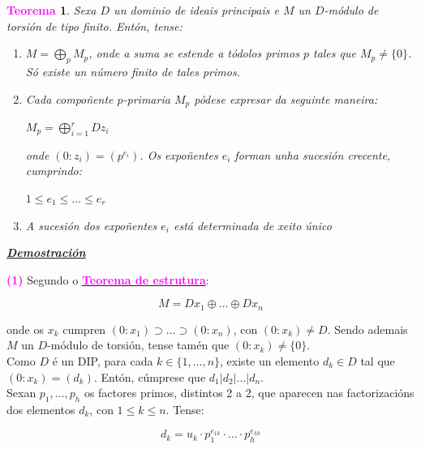\documentclass[twoside]{report}
\newcommand{\magbf}[1]{\textcolor{magenta}{\textbf{#1}}} %
\theoremstyle{mystyle}
\newtheorem{theo}{\magbf{Teorema}}[chapter]
\newenvironment{theorem}
{\begin{mdframed}[linecolor = magenta,backgroundcolor = classicrose, linewidth = 2mm]\begin{theo}}
{\end{theo}\end{mdframed}}
\begin{document}
\begin{theorem} \label{th4.3}
Sexa $D$ un dominio de ideais principais e $M$ un $D$-módulo de torsión de tipo finito. Entón, tense:
\begin{enumerate}
    \item $M = \displaystyle \bigoplus_{p}M_{p}$, onde a suma se estende a tódolos primos $p$ tales que $M_{p} \neq \{0\}$. Só existe un número finito de tales primos.
    \item Cada compoñente $p$-primaria $M_{p}$ pódese expresar da seguinte maneira:
        \begin{center}
            $M_{p} = \displaystyle \bigoplus_{i = 1}^{r}Dz_{i}$
        \end{center}
    onde $(0 : z_{i}) = (p^{e_{i}})$. Os expoñentes $e_{i}$ forman unha sucesión crecente, cumprindo:
        \begin{center}
            $1 \leq e_{1} \leq \ldots \leq e_{r}$
        \end{center}
    \item A sucesión dos expoñentes $e_{i}$ está determinada de xeito único
\end{enumerate}
\end{theorem}

\vspace{2mm}

\noindent \textbf{\textit{\underline{Demostración}}}

\vspace{2mm}

\noindent \magbf{(1)} Segundo o \hyperref[th4.2]{\magbf{Teorema de estrutura}}:

$$M = Dx_{1} \oplus \ldots \oplus Dx_{n}$$

\noindent onde os $x_{k}$ cumpren $(0 : x_{1}) \supset \dots \supset (0 : x_{n})$, con $(0 : x_{k}) \neq D$. Sendo ademais $M$ un $D$-módulo de torsión, tense tamén que $(0 : x_{k}) \neq \{0\}$.\\

\noindent Como $D$ é un DIP, para cada $k \in \{1, \dots, n\}$, existe un elemento $d_{k} \in D$ tal que $(0 : x_{k}) = (d_{k})$. Entón, cúmprese que $d_{1} | d_{2} | \dots | d_{n}$.\\

\noindent Sexan $p_{1}, \dots, p_{h}$ os factores primos, distintos 2 a 2, que aparecen nas factorizacións dos elementos $d_{k}$, con $1 \leq k \leq n$. Tense:

$$d_{k} = u_{k} \cdot p_{1}^{e_{1k}} \cdot \ldots \cdot p_{h}^{e_{hk}}$$
\end{document}
